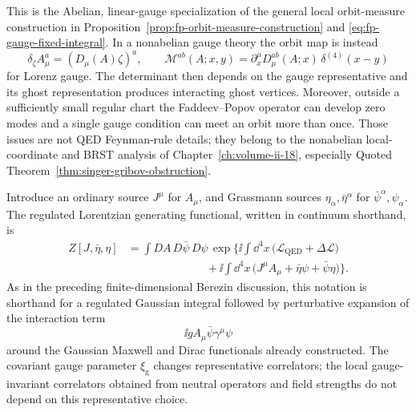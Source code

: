 This is the Abelian, linear-gauge specialization of the general
local orbit-measure construction in
Proposition~\ref{prop:fp-orbit-measure-construction} and
\eqref{eq:fp-gauge-fixed-integral}.  In a nonabelian gauge theory the orbit
map is instead
\[
  \delta_\zeta A_\mu^a=(D_\mu(A)\zeta)^a,
  \qquad
  \mathcal M^{ab}(A;x,y)
  =
  \partial_x^\mu D_\mu^{ab}(A;x)\,\delta^{(4)}(x-y)
\]
for Lorenz gauge.  The determinant then depends on the gauge representative
and its ghost representation produces interacting ghost vertices.  Moreover,
outside a sufficiently small regular chart the Faddeev--Popov operator can
develop zero modes and a single gauge condition can meet an orbit more than
once.  Those issues are not QED Feynman-rule details; they belong to the
nonabelian local-coordinate and BRST analysis of
Chapter~\ref{ch:volume-ii-18}, especially
Quoted Theorem~\ref{thm:singer-gribov-obstruction}.

\begin{definition}
\label{def:qed-gauge-fixed-source-functional}
Introduce an ordinary source \(J^\mu\) for \(A_\mu\), and Grassmann sources
\(\eta_\alpha,\bar\eta^\alpha\) for \(\bar\psi^\alpha,\psi_\alpha\). The
regulated Lorentzian generating functional, written in continuum shorthand, is
\[
\begin{aligned}
  Z[J,\bar\eta,\eta]
  &=
  \int DA\,D\bar\psi\,D\psi\,
  \exp\Biggl\{
    \ii\int\dd^4x\,
    \bigl(\mathcal L_{\mathrm{QED}}+\Delta\mathcal L\bigr) \\
  &\hspace{7em}
    +\ii\int\dd^4x\,
    \bigl(J^\mu A_\mu+\bar\eta\psi+\bar\psi\eta\bigr)
  \Biggr\}.
\end{aligned}
\]
As in the preceding finite-dimensional Berezin discussion, this notation is
shorthand for a regulated Gaussian integral followed by perturbative
expansion of the interaction term
\[
  \ii gA_\mu\bar\psi\gamma^\mu\psi
\]
around the Gaussian Maxwell and Dirac functionals already constructed.  The
covariant gauge parameter \(\xi_{\mathrm g}\) changes representative
correlators; the local gauge-invariant correlators obtained from neutral
operators and field strengths do not depend on this representative choice.
\end{definition}

